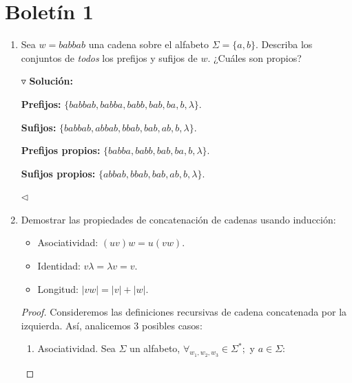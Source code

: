 \documentclass{article}
\begin{document}
\section*{\LARGE{Boletín 1}}
\begin{enumerate}
\item Sea $w = babbab$ una cadena sobre el alfabeto $\Sigma = \{a, b\}$.
  Describa los conjuntos de \textit{todos} los prefijos y sufijos de $w$.
  ¿Cuáles son propios?
  
  $\triangledown$ \textbf{Solución:}
  
  \textbf{Prefijos:} $\{babbab, babba, babb, bab, ba, b, \lambda\}$.
  
  \textbf{Sufijos:} $\{babbab, abbab, bbab, bab, ab, b, \lambda\}$.
  
  \textbf{Prefijos propios:} $\{babba, babb, bab, ba, b, \lambda\}$.

  \textbf{Sufijos propios:} $\{abbab, bbab, bab, ab, b, \lambda\}$.
  
  \hfill $\lhd$
\item Demostrar las propiedades de concatenación de cadenas usando inducción:
  \newcommand{\localtextbulletone}{\textcolor{gray}{\raisebox{.45ex}{\rule{.6ex}{.6ex}}}}
  \renewcommand{\labelitemi}{\localtextbulletone}
  \begin{itemize}
  \item Asociatividad: $(uv)w = u(vw)$.
  \item Identidad: $v\lambda = \lambda v = v$.
  \item Longitud: $|vw| = |v| + |w|$.
  \end{itemize}
  \renewcommand\qedsymbol{QED}
  \begin{proof} Consideremos las definiciones recursivas de cadena
    concatenada por la izquierda. Así, analicemos 3 posibles casos:
    \begin{enumerate}
    \item Asociatividad.
      Sea $\Sigma$ un alfabeto, $\forall_{w_1, w_2, w_3} \in \Sigma^{*};$ y $a \in \Sigma:$
      

\end{enumerate}
\end{proof}
\end{enumerate}
\end{document}
